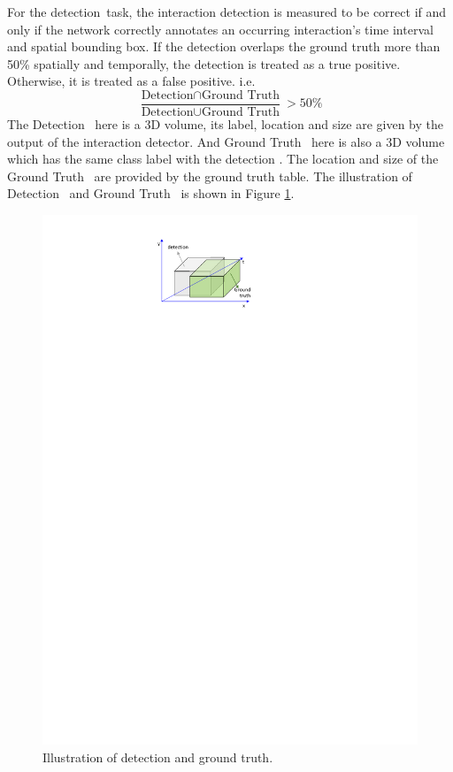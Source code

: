 \par 
For the \textquotesingle detection\textquotesingle \ task, the interaction detection is measured to be correct if and only if the network correctly annotates an occurring interaction's time interval and spatial bounding box. If the detection overlaps the ground truth more than 50\% spatially and temporally, the detection is treated as a true positive. Otherwise, it is treated as a false positive.  i.e.
\begin{equation*}
\frac{\text{Detection} \cap \text{Ground Truth}}{\text{Detection} \cup \text{Ground Truth}} > 50\%
\end{equation*}
The \textquotesingle Detection \textquotesingle \ here is a 3D volume, its label, location and size are given by the output of the interaction detector. And  \textquotesingle Ground Truth \textquotesingle \ here is also a 3D volume which has the same class label with the \textquotesingle detection \textquotesingle. The location and size of the \textquotesingle Ground Truth \textquotesingle \ are provided by the ground truth table.  The illustration of \textquotesingle Detection \textquotesingle \ and \textquotesingle Ground Truth \textquotesingle \ is shown in Figure \ref{fig:ut_det}.
\begin{figure}
	\includegraphics[trim=2cm 24.7cm 0cm 1cm]{figs/ut_det.pdf}
	\caption{Illustration of detection and ground truth.  }
	\label{fig:ut_det}
\end{figure}
